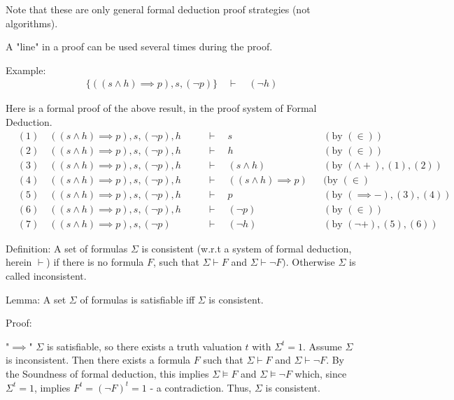 \documentclass{article}
\begin{document}
Note that these are only general formal deduction proof strategies (not algorithms).

A "line" in a proof can be used several times during the proof.

Example:
\begin{align*}
\{((s \wedge h) \implies p), s, (\neg p)\} \quad \vdash \quad (\neg h)
\end{align*}

Here is a formal proof of the above result, in the proof system of Formal Deduction.
\begin{align*}
&(1) \quad ((s \wedge h) \implies p), s, (\neg p), h \quad &&\vdash \quad s &&(\text{by } (\in)) \\
&(2) \quad ((s \wedge h) \implies p), s, (\neg p), h \quad &&\vdash \quad h &&(\text{by } (\in)) \\
&(3) \quad ((s \wedge h) \implies p), s, (\neg p), h \quad &&\vdash \quad (s \wedge h) &&(\text{by } (\wedge+),(1),(2)) \\
&(4) \quad ((s \wedge h) \implies p), s, (\neg p), h \quad &&\vdash \quad ((s \wedge h) \implies p) &&(\text{by } (\in) \\
&(5) \quad ((s \wedge h) \implies p), s, (\neg p), h \quad &&\vdash \quad p &&(\text{by } (\implies -),(3),(4)) \\
&(6) \quad ((s \wedge h) \implies p),s,(\neg p),h \quad &&\vdash \quad (\neg p) &&(\text{by } (\in)) \\
&(7) \quad ((s \wedge h) \implies p),s,(\neg p) \quad &&\vdash \quad (\neg h) &&(\text{by } (\neg +),(5),(6))
\end{align*}


Definition: A set of formulas $\Sigma$ is consistent (w.r.t a system of formal deduction, herein $\vdash$) if there is no formula $F$, such that $\Sigma \vdash F$ and $\Sigma \vdash \neg F)$. Otherwise $\Sigma$ is called inconsistent.

Lemma: A set $\Sigma$ of formulas is satisfiable iff $\Sigma$ is consistent.

Proof:

"$\implies$" $\Sigma$ is satisfiable, so there exists a truth valuation $t$ with $\Sigma^t = 1$. Assume $\Sigma$ is inconsistent. Then there exists a formula $F$ such that $\Sigma \vdash F$ and $\Sigma \vdash \neg F$. By the Soundness of formal deduction, this implies $\Sigma \vDash F$ and $\Sigma \vDash \neg F$ which, since $\Sigma^t = 1$, implies $F^t = (\neg F)^t = 1$ - a contradiction. Thus, $\Sigma$ is consistent.
\end{document}
